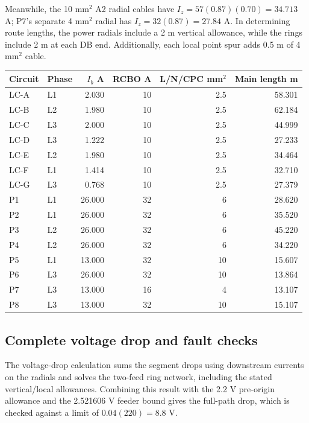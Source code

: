 Meanwhile, the 10 mm$^2$ A2 radial cables have $I_z=57(0.87)(0.70)=34.713$ A;  P7's separate 4 mm$^2$ radial has $I_z=32(0.87)=27.84$ A. In determining route lengths, the power radials include a 2 m vertical allowance, while the rings include 2 m at each DB end. Additionally, each local point spur adds 0.5 m of 4 mm$^2$ cable.
\begin{longtable}{llrrrr}\toprule
Circuit & Phase & $I_b$ A & RCBO A & L/N/CPC mm$^2$ & Main length m\\\midrule\endhead

LC-A & L1 & 2.030 & 10 & 2.5 & 58.301 \\
LC-B & L2 & 1.980 & 10 & 2.5 & 62.184 \\
LC-C & L3 & 2.000 & 10 & 2.5 & 44.999 \\
LC-D & L3 & 1.222 & 10 & 2.5 & 27.233 \\
LC-E & L2 & 1.980 & 10 & 2.5 & 34.464 \\
LC-F & L1 & 1.414 & 10 & 2.5 & 32.710 \\
LC-G & L3 & 0.768 & 10 & 2.5 & 27.379 \\
P1 & L1 & 26.000 & 32 & 6 & 28.620 \\
P2 & L1 & 26.000 & 32 & 6 & 35.520 \\
P3 & L2 & 26.000 & 32 & 6 & 45.220 \\
P4 & L2 & 26.000 & 32 & 6 & 34.220 \\
P5 & L1 & 13.000 & 32 & 10 & 15.607 \\
P6 & L3 & 26.000 & 32 & 10 & 13.864 \\
P7 & L3 & 13.000 & 16 & 4 & 13.107 \\
P8 & L3 & 13.000 & 32 & 10 & 15.107 \\

\bottomrule\end{longtable}
\subsection*{Complete voltage drop and fault checks}
The voltage-drop calculation sums the segment drops using downstream currents on the radials and solves the two-feed ring network, including the stated vertical/local allowances. Combining this result with the 2.2 V pre-origin allowance and the 2.521606 V feeder bound gives the full-path drop, which is checked against a limit of $0.04(220)=8.8$ V.

